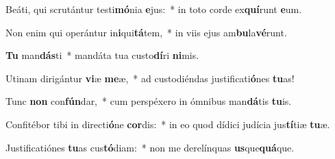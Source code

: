 \item Beáti, qui scrutántur testi\textbf{mó}nia \textbf{e}jus:~* in toto corde ex\textbf{quí}runt \textbf{e}um.
\item Non enim qui operántur in\textbf{i}qui\textbf{tá}tem,~* in viis ejus am\textbf{bu}la\textbf{vé}runt.
\item \textbf{Tu} man\textbf{dás}ti~* mandáta tua custo\textbf{dí}ri \textbf{ni}mis.
\item Utinam dirigántur \textbf{vi}æ \textbf{me}æ,~* ad custodiéndas justificati\textbf{ó}nes \textbf{tu}as!
\item Tunc \textbf{non} con\textbf{fún}dar,~* cum perspéxero in ómnibus man\textbf{dá}tis \textbf{tu}is.
\item Confitébor tibi in directi\textbf{ó}ne \textbf{cor}dis:~* in eo quod dídici judícia jus\textbf{tí}tiæ \textbf{tu}æ.
\item Justificatiónes \textbf{tu}as cus\textbf{tó}diam:~* non me derelínquas \textbf{us}que\textbf{quá}que.
